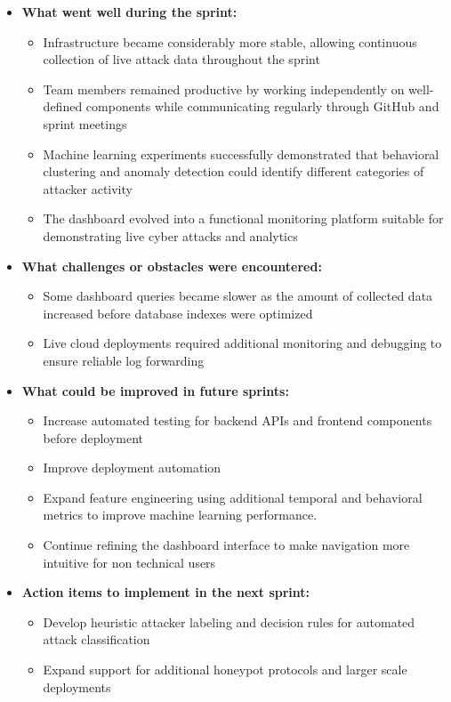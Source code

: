 \documentclass{article}
\begin{document}
\begin{itemize}
    \item \textbf{What went well during the sprint:}
    \begin{itemize}
        \item Infrastructure became considerably more stable, allowing continuous collection of live attack data throughout the sprint
        \item Team members remained productive by working independently on well-defined components while communicating regularly through GitHub and sprint meetings
        \item Machine learning experiments successfully demonstrated that behavioral clustering and anomaly detection could identify different categories of attacker activity
        \item The dashboard evolved into a functional monitoring platform suitable for demonstrating live cyber attacks and analytics
    \end{itemize}

    \item \textbf{What challenges or obstacles were encountered:}
    \begin{itemize}
        \item Some dashboard queries became slower as the amount of collected data increased before database indexes were optimized
        \item Live cloud deployments required additional monitoring and debugging to ensure reliable log forwarding
    \end{itemize}

    \item \textbf{What could be improved in future sprints:}
    \begin{itemize}
        \item Increase automated testing for backend APIs and frontend components before deployment
        \item Improve deployment automation
        \item Expand feature engineering using additional temporal and behavioral metrics to improve machine learning performance.
        \item Continue refining the dashboard interface to make navigation more intuitive for non technical users
    \end{itemize}

    \item \textbf{Action items to implement in the next sprint:}
    \begin{itemize}
        \item Develop heuristic attacker labeling and decision rules for automated attack classification
        \item Expand support for additional honeypot protocols and larger scale deployments
    \end{itemize}

\end{itemize}
\end{document}

